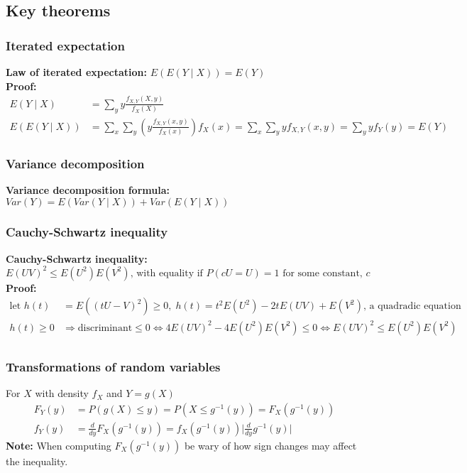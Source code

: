 \documentclass{article}
\newcommand{\abs}[1]{\lvert#1\rvert}
\begin{document}
\subsection{Key theorems}
\subsubsection{Iterated expectation}
\textbf{Law of iterated expectation: } $E(E(Y\mid X)) = E(Y)$\\
\textbf{Proof: }
\begin{align*}
    E(Y\mid X) &= \sum_y y\frac{f_{X, Y}(X, y)}{f_X(X)}\\
    E(E(Y\mid X)) &= \sum_x \sum_y \left ( y\frac{f_{X, Y}(x, y)}{f_X(x)} \right ) f_X(x) = \sum_x \sum_y y f_{X, Y}(x, y) = \sum_y y f_{Y}(y) = E(Y)
\end{align*}

\subsubsection{Variance decomposition}
\textbf{Variance decomposition formula: } $Var(Y) = E(Var(Y\mid X)) + Var(E(Y \mid X))$\\

\subsubsection{Cauchy-Schwartz inequality}
\textbf{Cauchy-Schwartz inequality: }$E(UV)^2 \leq E(U^2)E(V^2) \textrm{, with equality if } P(cU=U) = 1 \textrm{ for some constant, } c$\\
\textbf{Proof:}
\begin{align*}
    \textrm{let } h(t) &= E((tU - V)^2) \geq 0, \; h(t) = t^2E(U^2) - 2tE(UV) + E(V^2) \textrm{, a quadradic equation}\\
    h(t) \geq 0 &\Rightarrow \textrm{discriminant} \leq 0 \Longleftrightarrow 4E(UV)^2 - 4E(U^2)E(V^2) \leq 0 \Longleftrightarrow E(UV)^2 \leq E(U^2)E(V^2)\\
\end{align*}

\subsubsection{Transformations of random variables}
For $X$ with density $f_X$ and $Y = g(X)$
\begin{align*}
    F_Y(y) &= P(g(X)\leq y) = P(X \leq g^{-1}(y)) = F_X(g^{-1}(y))\\
    f_Y(y) &= \frac{d}{dy}F_X(g^{-1}(y)) = f_X(g^{-1}(y))\abs{\frac{d}{dy}g^{-1}(y)}
\end{align*}
\textbf{Note:} When computing $F_X(g^{-1}(y))$ be wary of how sign changes may affect the inequality.
\end{document}
